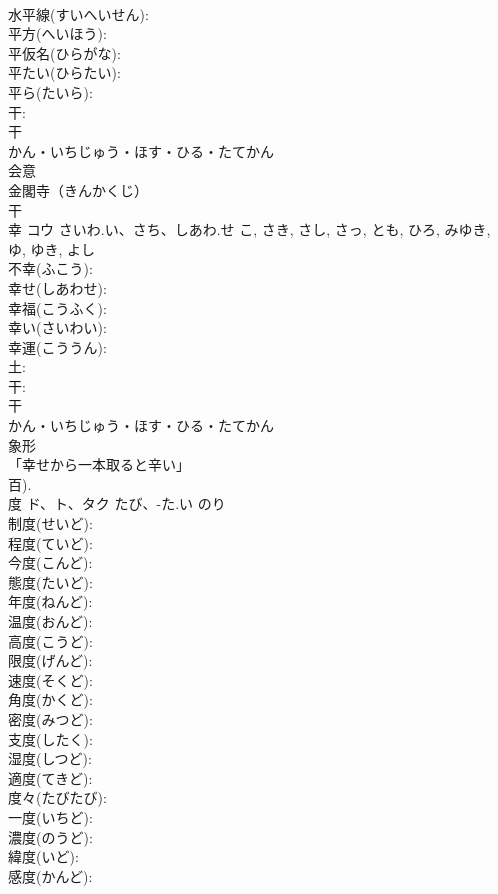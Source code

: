 \documentclass[8pt]{extreport}
\begin{document}
\begin{CJK}{UTF8}{min}
\\	水平線(すいへいせん): 
\\	平方(へいほう): 
\\	平仮名(ひらがな): 
\\	平たい(ひらたい): 
\\	平ら(たいら): 
\\	干: 
\\	干	
\\	かん・いちじゅう・ほす・ひる・たてかん	
\\	会意 
\\	金閣寺（きんかくじ） 
\\	干 
\\	幸	コウ	さいわ.い、さち、しあわ.せ	こ, さき, さし, さっ, とも, ひろ, みゆき, ゆ, ゆき, よし	
\\	不幸(ふこう): 
\\	幸せ(しあわせ): 
\\	幸福(こうふく): 
\\	幸い(さいわい): 
\\	幸運(こううん): 
\\	土: 
\\	干: 
\\	干	
\\	かん・いちじゅう・ほす・ひる・たてかん	
\\	象形 
\\	「幸せから一本取ると辛い」 
\\	百).
\\	度	ド、ト、タク	たび、-た.い	のり	
\\	制度(せいど): 
\\	程度(ていど): 
\\	今度(こんど): 
\\	態度(たいど): 
\\	年度(ねんど): 
\\	温度(おんど): 
\\	高度(こうど): 
\\	限度(げんど): 
\\	速度(そくど): 
\\	角度(かくど): 
\\	密度(みつど): 
\\	支度(したく): 
\\	湿度(しつど): 
\\	適度(てきど): 
\\	度々(たびたび): 
\\	一度(いちど): 
\\	濃度(のうど): 
\\	緯度(いど): 
\\	感度(かんど): 

\end{CJK}
\end{document}
